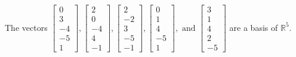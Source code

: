 \begin{exercise}
\begin{exerciseStatement}
  \end{exerciseStatement}
  \begin{exerciseAnswer}
   The vectors \(\left[\begin{array}{r}
0 \\
3 \\
-4 \\
-5 \\
1
\end{array}\right] , \left[\begin{array}{r}
2 \\
0 \\
-4 \\
4 \\
-1
\end{array}\right] , \left[\begin{array}{r}
2 \\
-2 \\
3 \\
-5 \\
-1
\end{array}\right] , \left[\begin{array}{r}
0 \\
1 \\
4 \\
-5 \\
1
\end{array}\right] , \text{ and } \left[\begin{array}{r}
3 \\
1 \\
4 \\
2 \\
-5
\end{array}\right]\) 
  	 are  a basis of \(\mathbb{R}^5\).
  


  \end{exerciseAnswer}
\end{exercise}